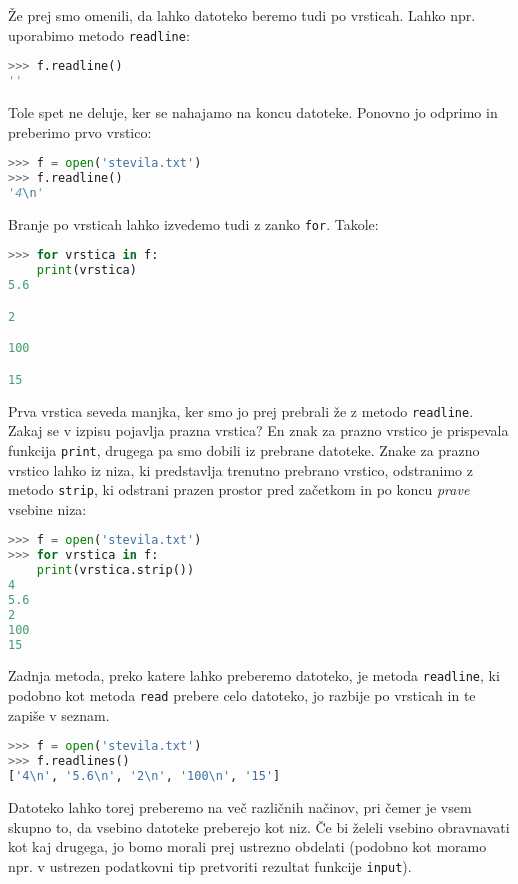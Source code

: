 Že prej smo omenili, da lahko datoteko beremo tudi po vrsticah. Lahko npr. uporabimo metodo \texttt{readline}:
\begin{lstlisting}[language=Python, showstringspaces=false]
>>> f.readline()
''
\end{lstlisting}
Tole spet ne deluje, ker se nahajamo na koncu datoteke. Ponovno jo odprimo in preberimo prvo vrstico:
\begin{lstlisting}[language=Python, showstringspaces=false]
>>> f = open('stevila.txt')
>>> f.readline()
'4\n'
\end{lstlisting}
Branje po vrsticah lahko izvedemo tudi z zanko \texttt{for}. Takole:
\begin{lstlisting}[language=Python, showstringspaces=false]
>>> for vrstica in f:
	print(vrstica)
5.6

2

100

15
\end{lstlisting}
Prva vrstica seveda manjka, ker smo jo prej prebrali že z metodo \texttt{readline}. Zakaj se v izpisu pojavlja prazna vrstica? En znak za prazno vrstico je prispevala funkcija \texttt{print}, drugega pa smo dobili iz prebrane datoteke. Znake za prazno vrstico lahko iz niza, ki predstavlja trenutno prebrano vrstico, odstranimo z metodo \texttt{strip}, ki odstrani prazen prostor pred začetkom in po koncu \emph{prave} vsebine niza:
\begin{lstlisting}[language=Python, showstringspaces=false]
>>> f = open('stevila.txt')
>>> for vrstica in f:
	print(vrstica.strip())
4
5.6
2
100
15
\end{lstlisting}

Zadnja metoda, preko katere lahko preberemo datoteko, je metoda \texttt{readline}, ki podobno kot metoda \texttt{read} prebere celo datoteko, jo razbije po vrsticah in te zapiše v seznam.
\begin{lstlisting}[language=Python, showstringspaces=false]
>>> f = open('stevila.txt')
>>> f.readlines()
['4\n', '5.6\n', '2\n', '100\n', '15']
\end{lstlisting}

Datoteko lahko torej preberemo na več različnih načinov, pri čemer je vsem skupno to, da vsebino datoteke preberejo kot niz. Če bi želeli vsebino obravnavati kot kaj drugega, jo bomo morali prej ustrezno obdelati (podobno kot moramo npr. v ustrezen podatkovni tip pretvoriti rezultat funkcije \texttt{input}).

